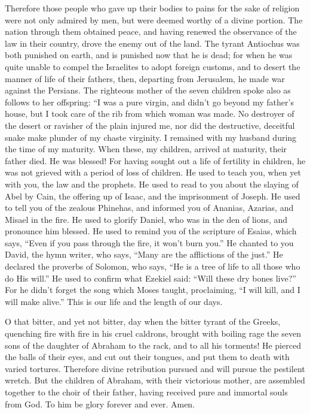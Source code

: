  Therefore those people who gave up their bodies to pains
for the sake of religion were not only admired by men, but were deemed
worthy of a divine portion.  The nation through them
obtained peace, and having renewed the observance of the law in their
country, drove the enemy out of the land.  The tyrant
Antiochus was both punished on earth, and is punished now that he is
dead; for when he was quite unable to compel the Israelites to adopt
foreign customs, and to desert the manner of life of their fathers,
 then, departing from Jerusalem, he made war against the
Persians.  The righteous mother of the seven children spoke
also as follows to her offspring: ``I was a pure virgin, and didn't go
beyond my father's house, but I took care of the rib from which woman
was made.  No destroyer of the desert or ravisher of the
plain injured me, nor did the destructive, deceitful snake make plunder
of my chaste virginity. I remained with my husband during the time of my
maturity.  When these, my children, arrived at maturity,
their father died. He was blessed! For having sought out a life of
fertility in children, he was not grieved with a period of loss of
children.  He used to teach you, when yet with you, the law
and the prophets.  He used to read to you about the slaying
of Abel by Cain, the offering up of Isaac, and the imprisonment of
Joseph.  He used to tell you of the zealous Phinehas, and
informed you of Ananias, Azarias, and Misael in the fire. 
He used to glorify Daniel, who was in the den of lions, and pronounce
him blessed.  He used to remind you of the scripture of
Esaias, which says, ``Even if you pass through the fire, it won't burn
you.''  He chanted to you David, the hymn writer, who says,
``Many are the afflictions of the just.''  He declared the
proverbs of Solomon, who says, ``He is a tree of life to all those who
do His will.''  He used to confirm what Ezekiel said:
``Will these dry bones live?''  For he didn't forget the
song which Moses taught, proclaiming, ``I will kill, and I will make
alive.''  This is our life and the length of our days.

 O that bitter, and yet not bitter, day when the bitter
tyrant of the Greeks, quenching fire with fire in his cruel caldrons,
brought with boiling rage the seven sons of the daughter of Abraham to
the rack, and to all his torments!  He pierced the balls of
their eyes, and cut out their tongues, and put them to death with varied
tortures.  Therefore divine retribution pursued and will
pursue the pestilent wretch.  But the children of Abraham,
with their victorious mother, are assembled together to the choir of
their father, having received pure and immortal souls from God.
 To him be glory forever and ever. Amen.

